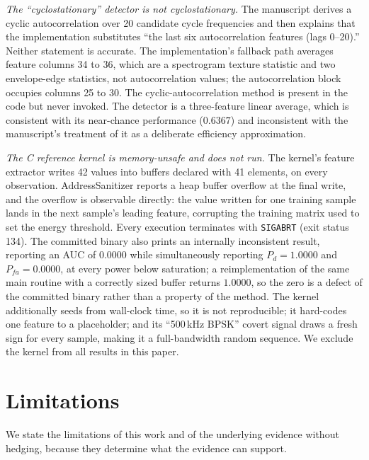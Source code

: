 \documentclass[conference]{IEEEtran}
\begin{document}
\emph{The ``cyclostationary'' detector is not cyclostationary.} \label{sec:cyc} The manuscript derives a cyclic autocorrelation over 20 candidate cycle frequencies and then explains that the implementation substitutes ``the last six autocorrelation features (lags 0--20).'' Neither statement is accurate. The implementation's fallback path averages feature columns 34 to 36, which are a spectrogram texture statistic and two envelope-edge statistics, not autocorrelation values; the autocorrelation block occupies columns 25 to 30. The cyclic-autocorrelation method is present in the code but never invoked. The detector is a three-feature linear average, which is consistent with its near-chance performance ($0.6367$) and inconsistent with the manuscript's treatment of it as a deliberate efficiency approximation.

\emph{The C reference kernel is memory-unsafe and does not run.} The kernel's feature extractor writes 42 values into buffers declared with 41 elements, on every observation. AddressSanitizer reports a heap buffer overflow at the final write, and the overflow is observable directly: the value written for one training sample lands in the next sample's leading feature, corrupting the training matrix used to set the energy threshold. Every execution terminates with \texttt{SIGABRT} (exit status 134). The committed binary also prints an internally inconsistent result, reporting an AUC of $0.0000$ while simultaneously reporting $\mathit{P}_d=1.0000$ and $\mathit{P}_{fa}=0.0000$, at every power below saturation; a reimplementation of the same main routine with a correctly sized buffer returns $1.0000$, so the zero is a defect of the committed binary rather than a property of the method. The kernel additionally seeds from wall-clock time, so it is not reproducible; it hard-codes one feature to a placeholder; and its ``500\,kHz BPSK'' covert signal draws a fresh sign for every sample, making it a full-bandwidth random sequence. We exclude the kernel from all results in this paper.

\section{Limitations}
\label{sec:limit}

We state the limitations of this work and of the underlying evidence without hedging, because they determine what the evidence can support.
\end{document}
